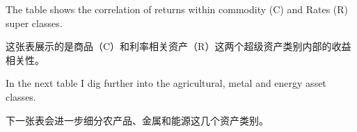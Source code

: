 \begin{bilingualtableblock} 
\end{bilingualtableblock}

\begin{englishblock} The table shows the correlation of returns within commodity (C) and Rates (R) super classes. \end{englishblock}

\begin{chineseblock}这张表展示的是商品（C）和利率相关资产（R）这两个超级资产类别内部的收益相关性。\end{chineseblock}

\bipairgap

\begin{englishblock} In the next table I dig further into the agricultural, metal and energy asset classes. \end{englishblock}

\begin{chineseblock}下一张表会进一步细分农产品、金属和能源这几个资产类别。\end{chineseblock}

